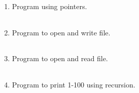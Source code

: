 \documentclass{exam}
\begin{document}
\begin{enumerate}
   \item  Program  using pointers.

   \begin{myTableStyle}
   \begin{center} \begin{tabular}{ |m{14cm}| } \hline
              \\ \hline
    \end{tabular} \end{center}
\end{myTableStyle}
  \pagebreak

   \item  Program  to open and write file.

   \begin{myTableStyle}
   \begin{center} \begin{tabular}{ |m{14cm}| } \hline
              \\ \hline
    \end{tabular} \end{center}
\end{myTableStyle}
  \pagebreak

   \item  Program  to open and read file.

   \begin{myTableStyle}
   \begin{center} \begin{tabular}{ |m{14cm}| } \hline
              \\ \hline
    \end{tabular} \end{center}
\end{myTableStyle}
  \pagebreak

   \item  Program  to print 1-100 using recursion.

   \begin{myTableStyle}
   \begin{center} \begin{tabular}{ |m{14cm}| } \hline
              \\ \hline
    \end{tabular} \end{center}
\end{myTableStyle}
  \pagebreak


\end{enumerate}
\end{document}

